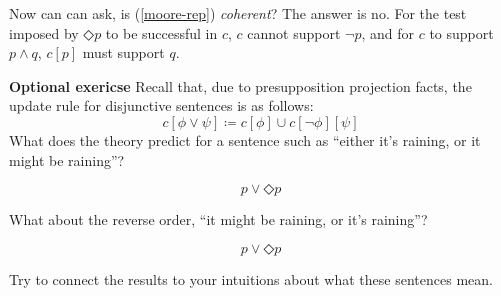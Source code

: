 \documentclass[nols,twoside,nofonts,nobib,nohyper]{tufte-handout}
\theoremstyle{definition}
\begin{document}
Now can can ask, is (\ref{moore-rep}) \textit{coherent}? The answer is no. For the test imposed by $◇ p$ to be successful in $c$, $c$ cannot support $¬ p$, and for $c$ to support $p ∧ q$, $c[p]$ must support $q$.

\begin{tcolorbox}
  \textbf{Optional exericse}
  \tcblower
Recall that, due to presupposition projection facts, the update rule for disjunctive sentences is as follows:
$$
c[ϕ ∨ ψ] ≔ c[ϕ] ∪ c[¬ ϕ][ψ]
$$
What does the theory predict for a sentence such as \enquote{either it's raining, or it might be raining}?

$$
p ∨ ◇ p
$$

What about the reverse order, \enquote{it might be raining, or it's raining}?

$$
 p ∨ ◇ p
$$

Try to connect the results to your intuitions about what these sentences mean.
\end{tcolorbox}

\printbibliography
\end{document}
